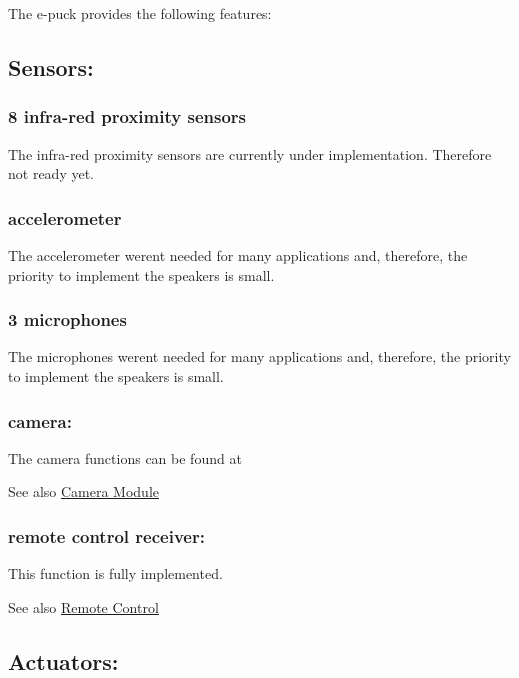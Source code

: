 The e-\/puck provides the following features\+: \hypertarget{group__epuck_epuck_sensor}{}\subsection{Sensors\+:}\label{group__epuck_epuck_sensor}
\hypertarget{group__epuck_epuck_prox}{}\subsubsection{8 infra-\/red proximity sensors}\label{group__epuck_epuck_prox}
The infra-\/red proximity sensors are currently under implementation. Therefore not ready yet. \hypertarget{group__epuck_epuck_acc}{}\subsubsection{accelerometer}\label{group__epuck_epuck_acc}
The accelerometer weren\textquotesingle{}t needed for many applications and, therefore, the priority to implement the speakers is small. \hypertarget{group__epuck_epuck_mic}{}\subsubsection{3 microphones}\label{group__epuck_epuck_mic}
The microphones weren\textquotesingle{}t needed for many applications and, therefore, the priority to implement the speakers is small. \hypertarget{group__epuck_epuck_camera}{}\subsubsection{camera\+:}\label{group__epuck_epuck_camera}
The camera functions can be found at \begin{DoxySeeAlso}{See also}
\hyperlink{group__camera}{Camera Module} 
\end{DoxySeeAlso}
\hypertarget{group__epuck_epuck_remote}{}\subsubsection{remote control receiver\+:}\label{group__epuck_epuck_remote}
This function is fully implemented. \begin{DoxySeeAlso}{See also}
\hyperlink{group__remotecontrol}{Remote Control} 
\end{DoxySeeAlso}
\hypertarget{group__epuck_epuck_output}{}\subsection{Actuators\+:}\label{group__epuck_epuck_output}
